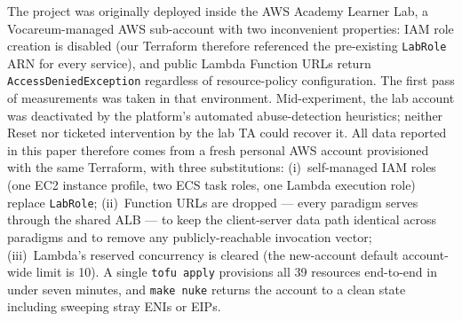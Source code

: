The project was originally deployed inside the AWS Academy Learner Lab,
a Vocareum-managed AWS sub-account with two inconvenient properties:
IAM role creation is disabled (our Terraform therefore referenced the
pre-existing \texttt{LabRole} ARN for every service), and public Lambda
Function URLs return \texttt{AccessDeniedException} regardless of
resource-policy configuration. The first pass of measurements was
taken in that environment. Mid-experiment, the lab account was
deactivated by the platform's automated abuse-detection heuristics;
neither Reset nor ticketed intervention by the lab TA could recover it.
All data reported in this paper therefore comes from a fresh personal
AWS account provisioned with the same Terraform, with three
substitutions: (i)~self-managed IAM roles (one EC2 instance profile,
two ECS task roles, one Lambda execution role) replace \texttt{LabRole};
(ii)~Function URLs are dropped --- every paradigm serves through the
shared ALB --- to keep the client-server data path identical across
paradigms and to remove any publicly-reachable invocation vector;
(iii)~Lambda's reserved concurrency is cleared (the new-account
default account-wide limit is 10). A single \texttt{tofu apply}
provisions all 39 resources end-to-end in under seven minutes, and
\texttt{make nuke} returns the account to a clean state including
sweeping stray ENIs or EIPs.
